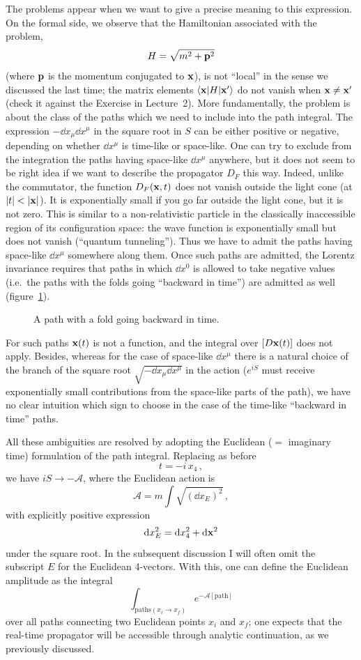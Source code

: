 The problems appear when we want to give a precise meaning to this expression.
On the formal side, we observe that the Hamiltonian associated with the
problem,
\[
H=\sqrt{m^2+\mathbf{p}^2}
\]
(where $\mathbf{p}$ is the momentum conjugated to $\mathbf{x}$), is not ``local'' in the
sense we discussed the last time; the matrix elements $\langle \mathbf{x}|H|\mathbf{x}'\rangle$
do not vanish when $\mathbf{x}\neq\mathbf{x}'$ (check it against the Exercise in
Lecture~2). More fundamentally, the problem is about the class of the paths
which we need to include into the path integral. The expression
$-\dd x_\mu \dd x^\mu$ in the square root in $S$ can be either positive or negative,
depending on whether $\dd x^\mu$ is time-like or space-like. One can try to
exclude from the integration the paths having space-like $\dd x^\mu$ anywhere,
but it does not seem to be right idea if we want to describe the propagator
$D_F$ this way. Indeed, unlike the commutator, the function $D_F(\mathbf{x},t)$ does
not vanish outside the light cone (at $|t|<|\xx|$). It is exponentially small
if you go far outside the light cone, but it is not zero. This is similar to a
non-relativistic particle in the classically inaccessible region of its
configuration space: the wave function is exponentially small but does not
vanish (``quantum tunneling''). Thus we have to admit the paths having
space-like $\dd x^\mu$ somewhere along them. Once such paths are admitted, the
Lorentz invariance requires that paths in which $\dd x^0$ is allowed to take
negative values (i.e.\ the paths with the folds going ``backward in time'')
are admitted as well (figure~\ref{fig:backpath}).
\begin{figure}[ht]
\centering{}
\caption{A path with a fold going backward in time.}
\label{fig:backpath}
\end{figure}

For such paths $\mathbf{x}(t)$ is not a function, and the integral over $[D\mathbf{x}(t)]$
does not apply. Besides, whereas for the case of space-like $\dd x^\mu$ there is
a natural choice of the branch of the square root $\sqrt{-\dd x_\mu \dd x^\mu}$ in the
action ($e^{iS}$ must receive exponentially small contributions from the
space-like parts of the path), we have no clear intuition which sign to choose
in the case of the time-like ``backward in time'' paths.

All these ambiguities are resolved by adopting the Euclidean ($=$ imaginary
time) formulation of the path integral. Replacing as before
\[
t=-i\,x_4\,,
\]
we have $iS\to-\mathcal A$, where the Euclidean action is
\[
\mathcal A=m\int\sqrt{(\dd x_E)^2}\,,
\]
with explicitly positive expression
\[
\mathop{}\!\mathrm{d} x_E^2=\mathop{}\!\mathrm{d} x_4^2+\mathop{}\!\mathrm{d}\mathbf{x}^2
\]
under the square root. In the subsequent discussion I will often omit the
subscript $E$ for the Euclidean 4-vectors. With this, one can define the
Euclidean amplitude as the integral
\[
\int_{\text{paths}(x_i\to x_f)}e^{-\mathcal A[\text{path}]}
\]
over all paths connecting two Euclidean points $x_i$ and $x_f$; one expects
that the real-time propagator will be accessible through analytic
continuation, as we previously discussed.

